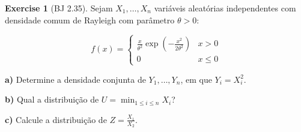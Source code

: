 \documentclass[
]{article}
\theoremstyle{definition}
\theoremstyle{definition}
\theoremstyle{definition}
\newtheorem{exercise}{Exercise}[section]
\theoremstyle{definition}
\theoremstyle{remark}
\begin{document}
\begin{exercise}[BJ 2.35]
Sejam \(X_{1},\ldots,X_{n}\) variáveis aleatórias independentes com densidade comum de Rayleigh com parâmetro \(\theta > 0\):

\begin{equation*}
f(x) = \begin{cases}
\frac{x}{\theta^{2}}\exp\left(-\frac{x^{2}}{2\theta^{2}}\right) & x>0 \\
0 & x\le 0
\end{cases}
\end{equation*}

\textbf{a)} Determine a densidade conjunta de \(Y_{1},\ldots,Y_{n}\), em que \(Y_{i} = X_{i}^{2}\).

\textbf{b)} Qual a distribuição de \(U = \min_{1 \le i \le n}X_{i}\)?

\textbf{c)} Calcule a distribuição de \(Z = \frac{X_{1}}{X_{2}}\).
\end{exercise}
\end{document}
